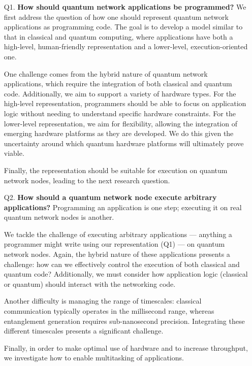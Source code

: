 \begin{itemize}
  \item[Q1.] \textbf{How should quantum network applications be programmed?}
    We first address the question of how one should represent quantum network applications as programming code.
    The goal is to develop a model similar to that in classical and quantum computing, where applications have both a high-level, human-friendly representation and a lower-level, execution-oriented one.

    One challenge comes from the hybrid nature of quantum network applications, which require the integration of both classical and quantum code.
    Additionally, we aim to support a variety of hardware types.
    For the high-level representation, programmers should be able to focus on application logic without needing to understand specific hardware constraints.
    For the lower-level representation, we aim for flexibility, allowing the integration of emerging hardware platforms as they are developed.
    We do this given the uncertainty around which quantum hardware platforms will ultimately prove viable.

    Finally, the representation should be suitable for execution on quantum network nodes, leading to the next research question.

  \item[Q2.] \textbf{How should a quantum network node execute arbitrary applications?}
    Programming an application is one step; executing it on real quantum network nodes is another.

    We tackle the challenge of executing arbitrary applications --- anything a programmer might write using our representation (Q1) --- on quantum network nodes.
    Again, the hybrid nature of these applications presents a challenge: how can we effectively control the execution of both classical and quantum code?
    Additionally, we must consider how application logic (classical or quantum) should interact with the networking code.
    
    Another difficulty is managing the range of timescales: classical communication typically operates in the millisecond range, whereas entanglement generation requires sub-nanosecond precision.
    Integrating these different timescales presents a significant challenge.

    Finally, in order to make optimal use of hardware and to increase throughput, we investigate how to enable multitasking of applications.


\end{itemize}
